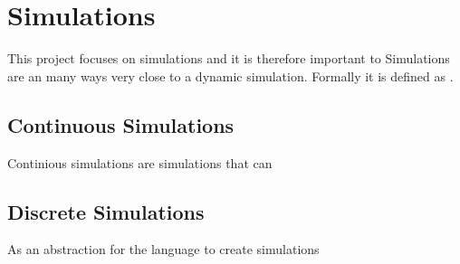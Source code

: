 \chapter{Simulations}
This project focuses on simulations and it is therefore important to  Simulations are an many ways very close to a dynamic simulation. Formally it is defined as  .

\section{Continuous Simulations}
Continious simulations are simulations that can 

\section{Discrete Simulations}


\label{simulationchoise}
As an abstraction for the language to create simulations

